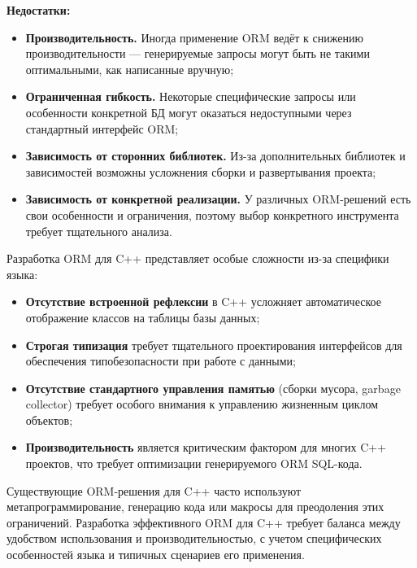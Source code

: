         \textbf{Недостатки:}
        \begin{itemize}
            \item \textbf{Производительность.} Иногда применение ORM ведёт к снижению производительности — генерируемые запросы могут быть не такими оптимальными, как написанные вручную;
            \item \textbf{Ограниченная гибкость.} Некоторые специфические запросы или особенности конкретной БД могут оказаться недоступными через стандартный интерфейс ORM;
            \item \textbf{Зависимость от сторонних библиотек.} Из-за дополнительных библиотек и зависимостей возможны усложнения сборки и развертывания проекта;
            \item \textbf{Зависимость от конкретной реализации.} У различных ORM-решений есть свои особенности и ограничения, поэтому выбор конкретного инструмента требует тщательного анализа.
        \end{itemize}


        Разработка ORM для C++ представляет особые сложности из-за специфики языка:

        \begin{itemize}
            \item \textbf{Отсутствие встроенной рефлексии} в C++ усложняет автоматическое отображение классов на таблицы базы данных;
            
            \item \textbf{Строгая типизация} требует тщательного проектирования интерфейсов для обеспечения типобезопасности при работе с данными;
            
            \item \textbf{Отсутствие стандартного управления памятью} (сборки мусора, garbage collector) требует особого внимания к управлению жизненным циклом объектов;
            
            \item \textbf{Производительность} является критическим фактором для многих C++ проектов, что требует оптимизации генерируемого ORM SQL-кода.
        \end{itemize}

        Существующие ORM-решения для C++ часто используют метапрограммирование, генерацию кода или макросы для преодоления этих ограничений. Разработка эффективного ORM для C++ требует баланса между удобством использования и производительностью, с учетом специфических особенностей языка и типичных сценариев его применения.

